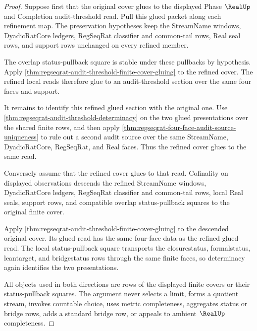\begin{proof}
Suppose first that the original cover glues to the displayed Phase $\RealUp$ and Completion audit-threshold read. Pull this glued packet along each refinement map. The preservation hypotheses keep the StreamName windows, DyadicRatCore ledgers, RegSeqRat classifier and common-tail rows, Real seal rows, and support rows unchanged on every refined member.

The overlap status-pullback square is stable under these pullbacks by hypothesis. Apply \autoref{thm:regseqrat-audit-threshold-finite-cover-gluing} to the refined cover. The refined local reads therefore glue to an audit-threshold section over the same four faces and support.

It remains to identify this refined glued section with the original one. Use \autoref{thm:regseqrat-audit-threshold-determinacy} on the two glued presentations over the shared finite rows, and then apply \autoref{thm:regseqrat-four-face-audit-source-uniqueness} to rule out a second audit source over the same StreamName, DyadicRatCore, RegSeqRat, and Real faces. Thus the refined cover glues to the same read.

Conversely assume that the refined cover glues to that read. Cofinality on displayed observations descends the refined StreamName windows, DyadicRatCore ledgers, RegSeqRat classifier and common-tail rows, local Real seals, support rows, and compatible overlap status-pullback squares to the original finite cover.

Apply \autoref{thm:regseqrat-audit-threshold-finite-cover-gluing} to the descended original cover. Its glued read has the same four-face data as the refined glued read. The local status-pullback square transports the closurestatus, formalstatus, leantarget, and bridgestatus rows through the same finite faces, so determinacy again identifies the two presentations.

All objects used in both directions are rows of the displayed finite covers or their status-pullback squares. The argument never selects a limit, forms a quotient stream, invokes countable choice, uses metric completeness, aggregates status or bridge rows, adds a standard bridge row, or appeals to ambient $\RealUp$ completeness.
\end{proof}

